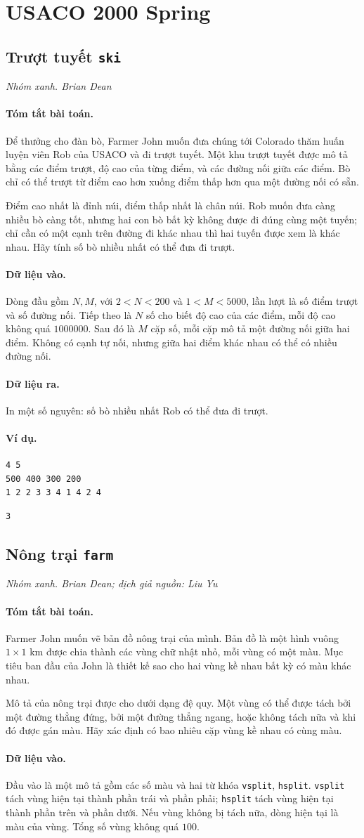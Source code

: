 \documentclass[11pt]{article}
\newcommand{\problem}[4]{%
  \subsection[#1 (#2)]{#1 \hfill {\normalsize\texttt{#2}}}%
  \noindent\textit{#3. #4}\par\smallskip
}
\newcommand{\iosec}[1]{\paragraph{#1}}
\begin{document}
\section{USACO 2000 Spring}

\problem{Trượt tuyết}{ski}{Nhóm xanh}{Brian Dean}

\iosec{Tóm tắt bài toán.}
Để thưởng cho đàn bò, Farmer John muốn đưa chúng tới Colorado thăm huấn luyện
viên Rob của USACO và đi trượt tuyết. Một khu trượt tuyết được mô tả bằng các
điểm trượt, độ cao của từng điểm, và các đường nối giữa các điểm. Bò chỉ có
thể trượt từ điểm cao hơn xuống điểm thấp hơn qua một đường nối có sẵn.

Điểm cao nhất là đỉnh núi, điểm thấp nhất là chân núi. Rob muốn đưa càng nhiều
bò càng tốt, nhưng hai con bò bất kỳ không được đi đúng cùng một tuyến; chỉ
cần có một cạnh trên đường đi khác nhau thì hai tuyến được xem là khác nhau.
Hãy tính số bò nhiều nhất có thể đưa đi trượt.

\iosec{Dữ liệu vào.}
Dòng đầu gồm \(N,M\), với \(2<N<200\) và \(1<M<5000\), lần lượt là số điểm
trượt và số đường nối. Tiếp theo là \(N\) số cho biết độ cao của các điểm,
mỗi độ cao không quá \(1000000\). Sau đó là \(M\) cặp số, mỗi cặp mô tả một
đường nối giữa hai điểm. Không có cạnh tự nối, nhưng giữa hai điểm khác nhau
có thể có nhiều đường nối.

\iosec{Dữ liệu ra.}
In một số nguyên: số bò nhiều nhất Rob có thể đưa đi trượt.

\iosec{Ví dụ.}
\begin{verbatim}
4 5
500 400 300 200
1 2 2 3 3 4 1 4 2 4
\end{verbatim}

\begin{verbatim}
3
\end{verbatim}

\problem{Nông trại}{farm}{Nhóm xanh}{Brian Dean; dịch giả nguồn: Liu Yu}

\iosec{Tóm tắt bài toán.}
Farmer John muốn vẽ bản đồ nông trại của mình. Bản đồ là một hình vuông
\(1\times 1\) km được chia thành các vùng chữ nhật nhỏ, mỗi vùng có một màu.
Mục tiêu ban đầu của John là thiết kế sao cho hai vùng kề nhau bất kỳ có màu
khác nhau.

Mô tả của nông trại được cho dưới dạng đệ quy. Một vùng có thể được tách bởi
một đường thẳng đứng, bởi một đường thẳng ngang, hoặc không tách nữa và khi đó
được gán màu. Hãy xác định có bao nhiêu cặp vùng kề nhau có cùng màu.

\iosec{Dữ liệu vào.}
Đầu vào là một mô tả gồm các số màu và hai từ khóa \texttt{vsplit},
\texttt{hsplit}. \texttt{vsplit} tách vùng hiện tại thành phần trái và phần
phải; \texttt{hsplit} tách vùng hiện tại thành phần trên và phần dưới. Nếu
vùng không bị tách nữa, dòng hiện tại là màu của vùng. Tổng số vùng không quá
\(100\).
\end{document}

